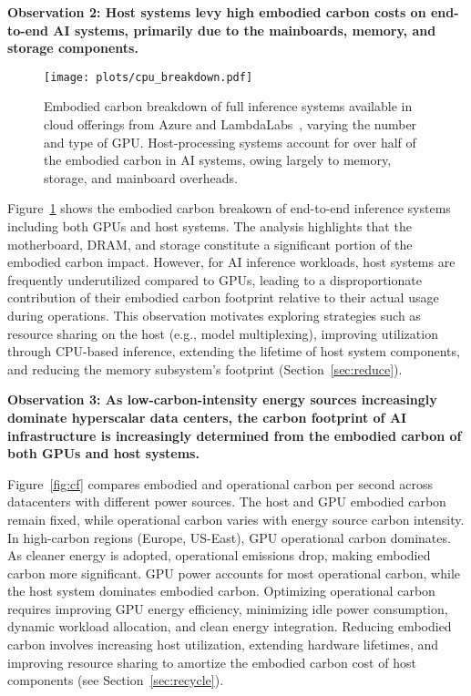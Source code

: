 \textbf{Observation 2: Host systems levy high embodied carbon costs on end-to-end AI systems, primarily due to the mainboards, memory, and storage components.}



\begin{figure}[t]
    \centering
\texttt{[image: plots/cpu\_breakdown.pdf]}
\vspace{-1em}
    \caption{ Embodied carbon breakdown of full inference systems available in cloud offerings from Azure and LambdaLabs~\cite{azure-gpu,lambdalabsCloudDeep}, varying the number and type of GPU. Host-processing systems account for over half of the embodied carbon in AI systems, owing largely to memory, storage, and mainboard overheads.}
    \label{fig:cf_cpu_h}
    \vspace{-2em}
\end{figure}





Figure~\ref{fig:cf_cpu_h} shows the embodied carbon breakown of end-to-end inference systems including both GPUs and host systems.
The analysis highlights that the motherboard, DRAM, and storage constitute a significant portion of the embodied carbon impact.
However, for AI inference workloads, host systems are frequently underutilized compared to GPUs, leading to a disproportionate contribution of their embodied carbon footprint relative to their actual usage during operations.
This observation motivates exploring strategies such as resource sharing on the host (e.g., model multiplexing), improving utilization through CPU-based inference, extending the lifetime of host system components, and reducing the memory subsystem's footprint (Section~\ref{sec:reduce}).


\textbf{Observation 3: As low-carbon-intensity energy sources increasingly dominate hyperscalar data centers, the carbon footprint of AI infrastructure is increasingly determined from the embodied carbon of both GPUs and host systems.}


Figure~\ref{fig:cf} compares embodied and operational carbon per second across datacenters with different power sources. The host and GPU embodied carbon remain fixed, while operational carbon varies with energy source carbon intensity. In high-carbon regions (Europe, US-East), GPU operational carbon dominates. As cleaner energy is adopted, operational emissions drop, making embodied carbon more significant. GPU power accounts for most operational carbon, while the host system dominates embodied carbon. Optimizing operational carbon requires improving GPU energy efficiency, minimizing idle power consumption, dynamic workload allocation, and clean energy integration. Reducing embodied carbon involves increasing host utilization, extending hardware lifetimes, and improving resource sharing to amortize the embodied carbon cost of host components (see Section~\ref{sec:recycle}).

